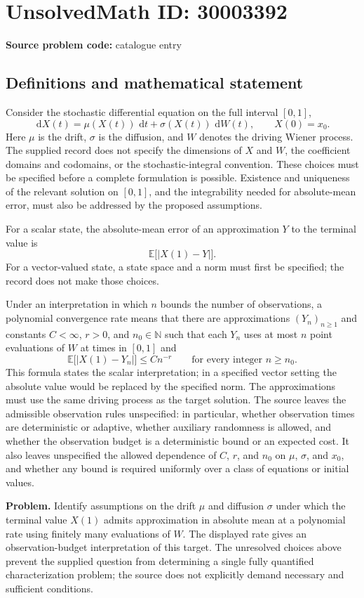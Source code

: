\documentclass[11pt]{article}
\newcommand{\N}{\mathbb{N}}
\newcommand{\E}{\mathbb{E}}
\newcommand{\dd}{\,\mathrm{d}}
\begin{document}
\section*{UnsolvedMath ID: 30003392}
\textbf{Source problem code:} catalogue entry
\subsection{Definitions and mathematical statement}
Consider the stochastic differential equation on the full interval $[0,1]$,
\[
\dd X(t)=\mu(X(t))\,\dd t+\sigma(X(t))\,\dd W(t),\qquad X(0)=x_0.
\]
Here $\mu$ is the drift, $\sigma$ is the diffusion, and $W$ denotes the driving Wiener process. The supplied record does not specify the dimensions of $X$ and $W$, the coefficient domains and codomains, or the stochastic-integral convention. These choices must be specified before a complete formulation is possible. Existence and uniqueness of the relevant solution on $[0,1]$, and the integrability needed for absolute-mean error, must also be addressed by the proposed assumptions.

For a scalar state, the absolute-mean error of an approximation $Y$ to the terminal value is
\[
\E\bigl[|X(1)-Y|\bigr].
\]
For a vector-valued state, a state space and a norm must first be specified; the record does not make those choices.

Under an interpretation in which $n$ bounds the number of observations, a polynomial convergence rate means that there are approximations $(Y_n)_{n\geq1}$ and constants $C<\infty$, $r>0$, and $n_0\in\N$ such that each $Y_n$ uses at most $n$ point evaluations of $W$ at times in $[0,1]$ and
\[
\E\bigl[|X(1)-Y_n|\bigr]\leq C n^{-r}
\qquad\text{for every integer }n\geq n_0.
\]
This formula states the scalar interpretation; in a specified vector setting the absolute value would be replaced by the specified norm. The approximations must use the same driving process as the target solution. The source leaves the admissible observation rules unspecified: in particular, whether observation times are deterministic or adaptive, whether auxiliary randomness is allowed, and whether the observation budget is a deterministic bound or an expected cost. It also leaves unspecified the allowed dependence of $C$, $r$, and $n_0$ on $\mu$, $\sigma$, and $x_0$, and whether any bound is required uniformly over a class of equations or initial values.

\textbf{Problem.} Identify assumptions on the drift $\mu$ and diffusion $\sigma$ under which the terminal value $X(1)$ admits approximation in absolute mean at a polynomial rate using finitely many evaluations of $W$. The displayed rate gives an observation-budget interpretation of this target. The unresolved choices above prevent the supplied question from determining a single fully quantified characterization problem; the source does not explicitly demand necessary and sufficient conditions.
\end{document}
